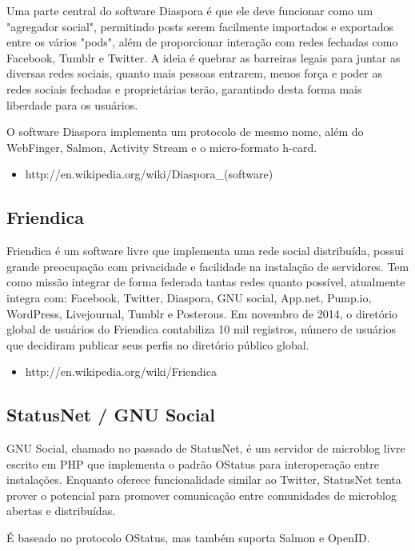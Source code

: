 \documentclass[12pt]{article}
\begin{document}
Uma parte central do software Diaspora é que ele deve funcionar como um
"agregador social", permitindo posts serem facilmente importados e exportados
entre os vários "pods", além de proporcionar interação com redes fechadas como
Facebook, Tumblr e Twitter. A ideia é quebrar as barreiras legais para juntar as
diversas redes sociais, quanto mais pessoas entrarem, menos força e poder as
redes sociais fechadas e proprietárias terão, garantindo desta forma mais
liberdade para os usuários.

O software Diaspora implementa um protocolo de mesmo nome, além do WebFinger,
Salmon, Activity Stream e o micro-formato h-card.

\begin{itemize}
  \item http://en.wikipedia.org/wiki/Diaspora\_(software)
\end{itemize}

\subsection{Friendica}

Friendica é um software livre que implementa uma rede social distribuída,
possui grande preocupação com privacidade e facilidade na instalação de
servidores. Tem como missão integrar de forma federada tantas redes quanto
possível, atualmente integra com: Facebook, Twitter, Diaspora, GNU social,
App.net, Pump.io, WordPress, Livejournal, Tumblr e Posterous. Em novembro de
2014, o diretório global de usuários do Friendica contabiliza 10 mil
registros, número de usuários que decidiram publicar seus perfis no diretório
público global.

\begin{itemize}
  \item http://en.wikipedia.org/wiki/Friendica
\end{itemize}

\subsection{StatusNet / GNU Social}

GNU Social, chamado no passado de StatusNet, é um servidor de microblog livre
escrito em PHP que implementa o padrão OStatus para interoperação entre
instalações. Enquanto oferece funcionalidade similar ao Twitter, StatusNet
tenta prover o potencial para promover comunicação entre comunidades de
microblog abertas e distribuídas.

É baseado no protocolo OStatus, mas também suporta Salmon e OpenID.
\end{document}
